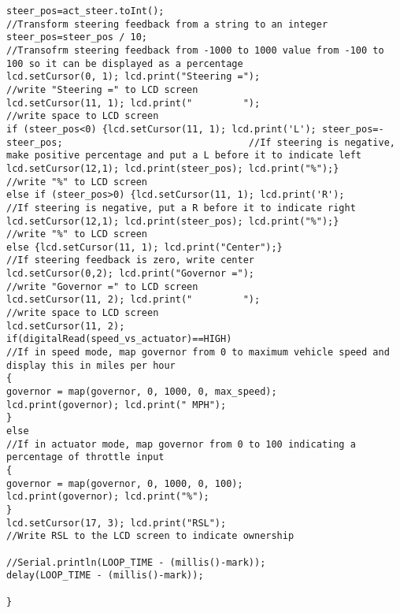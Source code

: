 \begin{lstlisting}[breaklines=true,basicstyle=\tiny]
steer_pos=act_steer.toInt();                                                                                    //Transform steering feedback from a string to an integer
steer_pos=steer_pos / 10;                                                                                       //Transofrm steering feedback from -1000 to 1000 value from -100 to 100 so it can be displayed as a percentage
lcd.setCursor(0, 1); lcd.print("Steering =");                                                                   //write "Steering =" to LCD screen
lcd.setCursor(11, 1); lcd.print("         ");                                                                   //write space to LCD screen
if (steer_pos<0) {lcd.setCursor(11, 1); lcd.print('L'); steer_pos=-steer_pos;                                 //If steering is negative, make positive percentage and put a L before it to indicate left
lcd.setCursor(12,1); lcd.print(steer_pos); lcd.print("%");}                                                   //write "%" to LCD screen
else if (steer_pos>0) {lcd.setCursor(11, 1); lcd.print('R');                                                  //If steering is negative, put a R before it to indicate right
lcd.setCursor(12,1); lcd.print(steer_pos); lcd.print("%");}                                                   //write "%" to LCD screen
else {lcd.setCursor(11, 1); lcd.print("Center");}                                                             //If steering feedback is zero, write center
lcd.setCursor(0,2); lcd.print("Governor =");                                                                    //write "Governor =" to LCD screen
lcd.setCursor(11, 2); lcd.print("         ");                                                                   //write space to LCD screen
lcd.setCursor(11, 2);
if(digitalRead(speed_vs_actuator)==HIGH)                                                                        //If in speed mode, map governor from 0 to maximum vehicle speed and display this in miles per hour
{
governor = map(governor, 0, 1000, 0, max_speed);
lcd.print(governor); lcd.print(" MPH");
}
else                                                                                                            //If in actuator mode, map governor from 0 to 100 indicating a percentage of throttle input
{
governor = map(governor, 0, 1000, 0, 100);
lcd.print(governor); lcd.print("%");
}      
lcd.setCursor(17, 3); lcd.print("RSL");                                                                          //Write RSL to the LCD screen to indicate ownership

//Serial.println(LOOP_TIME - (millis()-mark));
delay(LOOP_TIME - (millis()-mark));

}

\end{lstlisting}


